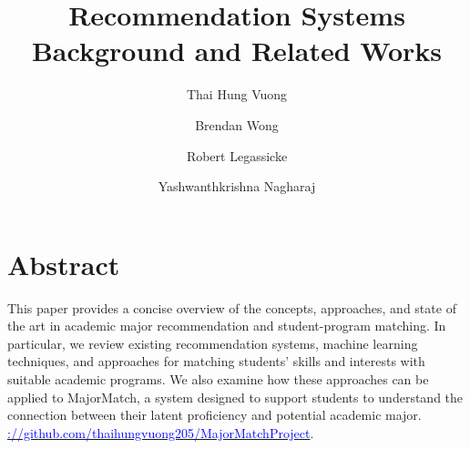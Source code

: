 \documentclass[sigconf]{acmart}
\begin{document}

\title{Recommendation Systems Background and Related Works}


\author{Thai Hung Vuong}

\author{Brendan Wong}

\author{Robert Legassicke}

\author{Yashwanthkrishna Nagharaj}


\maketitle


\section*{Abstract}

This paper provides a concise overview of the concepts, approaches, and state of the art in academic major recommendation and student-program matching. In particular, we review existing recommendation systems, machine learning techniques, and approaches for matching students' skills and interests with suitable academic programs. We also examine how these approaches can be applied to MajorMatch, a system designed to support students to understand the connection between their latent proficiency and potential academic major. \href{https://github.com/thaihungvuong205/MajorMatchProject.git}
{\textcolor{blue}{\underlinehttps://github.com/thaihungvuong205/MajorMatchProject}}.

\setcounter{section}{1}
\setcounter{subsection}{0}
\end{document}
